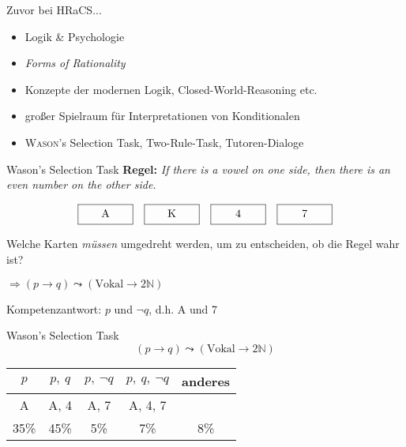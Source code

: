 
\begin{frame}{Zuvor bei HRaCS...}
    \begin{itemize}
        \item Logik \& Psychologie
        \item \emph{Forms of Rationality}
        \pause
        
        \item Konzepte der modernen Logik, Closed-World-Reasoning etc.
        \item großer Spielraum für Interpretationen von Konditionalen
        \pause

        \item \textsc{Wason}'s Selection Task, Two-Rule-Task, Tutoren-Dialoge
    \end{itemize}
\end{frame}


\begin{frame}{Wason's Selection Task {\scriptsize \cite[S.~44-46]{stenningHumanReasoningCognitive2008}}}
    \textbf{Regel:} \emph{If there is a vowel on one side, then there is an even number on the other side.}

    \[
        \framebox[5em][c]{A\strut}\quad
        \framebox[5em][c]{K\strut}\quad
        \framebox[5em][c]{4\strut}\quad
        \framebox[5em][c]{7\strut}
    \]

    Welche Karten \emph{müssen} umgedreht werden, um zu entscheiden, ob die Regel wahr ist?

    $\Rightarrow (p \to q) \leadsto (\text{Vokal} \to 2\mathbb{N})$

    Kompetenzantwort: $p$ und $\lnot q$, d.h. A und 7
\end{frame}


\begin{frame}{Wason's Selection Task {\scriptsize \cite[S.~44-46]{stenningHumanReasoningCognitive2008}}}
    $$(p \to q) \leadsto (\text{Vokal} \to 2\mathbb{N})$$

    \begin{center}
        \begin{tabular}{c | c | c | c | c}
            $p$ &$p,~q$ &\alert{$p, ~\lnot q$} &$p, ~q, ~\lnot q$ &anderes \\
            \hline
            A &A, 4 &\alert{A, 7} &A, 4, 7 & \\
            \hline \hline
            35\% &45\% &\alert{5\%} &7\% &8\%
        \end{tabular}
    \end{center}
\end{frame}



